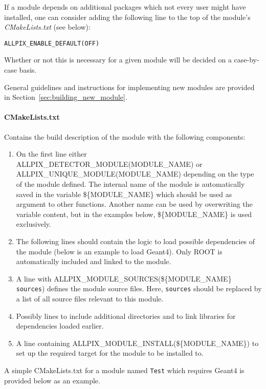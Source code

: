 If a module depends on additional packages which not every user might have installed, one can consider adding the following line to the top of the module's \textit{CMakeLists.txt} (see below):
\begin{verbatim}
ALLPIX_ENABLE_DEFAULT(OFF)
\end{verbatim}
Whether or not this is necessary for a given module will be decided on a case-by-case basis.

General guidelines and instructions for implementing new modules are provided in Section~\ref{sec:building_new_module}.

\paragraph{CMakeLists.txt}
Contains the build description of the module with the following components:
\begin{enumerate}
\item On the first line either ALLPIX\_DETECTOR\_MODULE(MODULE\_NAME) or \\ ALLPIX\_UNIQUE\_MODULE(MODULE\_NAME) depending on the type of the module defined.
The internal name of the module is automatically saved in the variable \$\{MODULE\_NAME\} which should be used as argument to other functions.
Another name can be used by overwriting the variable content, but in the examples below, \$\{MODULE\_NAME\} is used exclusively.
\item The following lines should contain the logic to load possible dependencies of the module (below is an example to load Geant4).
Only ROOT is automatically included and linked to the module.
\item A line with ALLPIX\_MODULE\_SOURCES(\$\{MODULE\_NAME\} \texttt{sources}) defines the module source files. Here, \texttt{sources} should be replaced by a list of all source files relevant to this module.
\item Possibly lines to include additional directories and to link libraries for dependencies loaded earlier.
\item A line containing ALLPIX\_MODULE\_INSTALL(\$\{MODULE\_NAME\}) to set up the required target for the module to be installed to.
\end{enumerate}

A simple CMakeLists.txt for a module named \texttt{Test} which requires Geant4 is provided below as an example.
\vspace{5pt}

